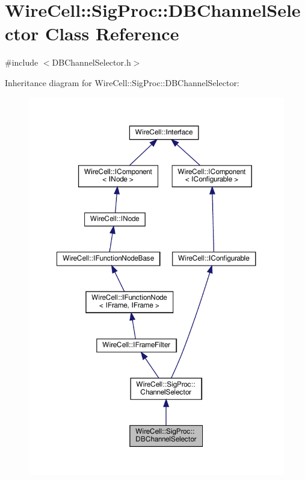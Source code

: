 \hypertarget{class_wire_cell_1_1_sig_proc_1_1_d_b_channel_selector}{}\section{Wire\+Cell\+:\+:Sig\+Proc\+:\+:D\+B\+Channel\+Selector Class Reference}
\label{class_wire_cell_1_1_sig_proc_1_1_d_b_channel_selector}


{\ttfamily \#include $<$D\+B\+Channel\+Selector.\+h$>$}



Inheritance diagram for Wire\+Cell\+:\+:Sig\+Proc\+:\+:D\+B\+Channel\+Selector\+:
\nopagebreak
\begin{figure}[H]
\begin{center}
\leavevmode
\includegraphics[width=350pt]{class_wire_cell_1_1_sig_proc_1_1_d_b_channel_selector__inherit__graph}
\end{center}
\end{figure}


